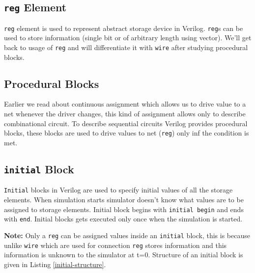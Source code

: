 \documentclass[a4paper,10pt]{article}
\theoremstyle{mytheor}
\newcommand{
  \insertverilog}[3]{
  
}
\begin{document}
\subsection{\lstinline[style=verilog-inline-style]{reg} Element}
\lstinline[style=verilog-inline-style]{reg} element is used to
represent abstract storage device in
Verilog. \lstinline[style=verilog-inline-style]{reg}s can be used to
store information (single bit or of arbitrary length using
vector). We'll get back to usage of
\lstinline[style=verilog-inline-style]{reg} and will differentiate it
with \lstinline[style=verilog-inline-style]{wire} after studying
procedural blocks.

\subsection{Procedural Blocks}
Earlier we read about continuous assignment which allows us to drive
value to a net whenever the driver changes, this kind of assignment
allows only to describe combinational circuit. To describe sequential
circuits Verilog provides procedural blocks, these blocks are used to
drive values to net (\lstinline[style=verilog-inline-style]{reg}) only
inf the condition is met.

\subsection{\lstinline[style=verilog-inline-style]{initial} Block}
\lstinline[style=verilog-inline-style]{Initial} blocks in Verilog are
used to specify initial values of all the storage elements. When
simulation starts simulator doesn't know what values are to be
assigned to storage elements. Initial block begins with
\lstinline[style=verilog-inline-style]{initial begin} and ends with
\lstinline[style=verilog-inline-style]{end}. Initial blocks gets
executed only once when the simulation is started.

{\color{red}\textbf{Note:}} Only a
\lstinline[style=verilog-inline-style]{reg} can be assigned values
inside an \lstinline[style=verilog-inline-style]{initial} block, this
is because unlike \lstinline[style=verilog-inline-style]{wire} which
are used for connection \lstinline[style=verilog-inline-style]{reg}
stores information and this information is unknown to the simulator at
t=0. Structure of an initial block is given in Listing \ref{initial-structure}.

\insertverilog{./verilog_files/initialStructure.v}{initial-structure}{Structure of an initial block.} 
\end{document}
